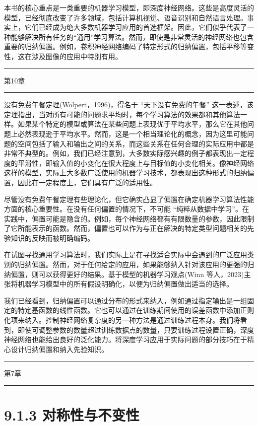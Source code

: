 \documentclass[10pt]{article}
\newcommand{\HRule}{\begin{center}\rule{0.9\linewidth}{0.2mm}\end{center}}
\begin{document}
本书的核心重点是一类重要的机器学习模型，即深度神经网络。这些是高度灵活的模型，已经彻底改变了许多领域，包括计算机视觉、语音识别和自然语言处理。事实上，它们已经成为绝大多数机器学习应用的首选框架。因此，它们似乎代表了一种能够解决所有任务的“通用”学习算法。然而，即使是非常灵活的神经网络也包含重要的归纳偏置。例如，卷积神经网络编码了特定形式的归纳偏置，包括平移等变性，这在涉及图像的应用中特别有用。

\HRule

第10章

\HRule

没有免费午餐定理(Wolpert，1996)，得名于 “天下没有免费的午餐” 这一表述，该定理指出，当对所有可能的问题求平均时，每个学习算法的效果都和其他算法一样。如果某个特定的模型或算法在某些问题上表现优于平均水平，那么它在其他问题上必然表现逊于平均水平。然而，这是一个相当理论化的概念，因为这里可能问题的空间包括了输入和输出之间的关系，而这些关系在任何合理的实际应用中都是非常不典型的。例如，我们已经注意到，大多数实际感兴趣的例子都表现出一定程度的平滑性，即输入值的小变化在很大程度上与目标值的小变化相关。像神经网络这样的模型，实际上大多数广泛使用的机器学习技术，都表现出这种形式的归纳偏置，因此在一定程度上，它们具有广泛的适用性。

尽管没有免费午餐定理有些理论化，但它确实凸显了偏置在确定机器学习算法性能方面的核心重要性。在没有任何偏置的情况下，不可能 “纯粹从数据中学习”。在实践中，偏置可能是隐含的。例如，每个神经网络都有有限数量的参数，因此限制了它所能表示的函数。然而，偏置也可以作为与正在解决的特定类型问题相关的先验知识的反映而被明确编码。

在试图寻找通用学习算法时，我们实际上是在寻找适合实际中会遇到的广泛应用类别的归纳偏置。然而，对于任何给定的应用，如果能够纳入针对该应用的更强的归纳偏置，则可以获得更好的结果。基于模型的机器学习观点(Winn 等人，2023)主张将机器学习模型中的所有假设明确化，以便为归纳偏置做出适当的选择。

我们已经看到，归纳偏置可以通过分布的形式来纳入，例如通过指定输出是一组固定的特定基函数的线性函数。它也可以通过在训练期间使用的误差函数中添加正则化项来纳入。控制神经网络复杂度的另一种方法是通过训练过程本身。我们将看到，即使可调整参数的数量超过训练数据点的数量，只要训练过程设置正确，深度神经网络也能给出良好的泛化能力。将深度学习应用于实际问题的部分技巧在于精心设计归纳偏置和纳入先验知识。

\HRule

第7章

\HRule

\section*{9.1.3 对称性与不变性}
\end{document}
